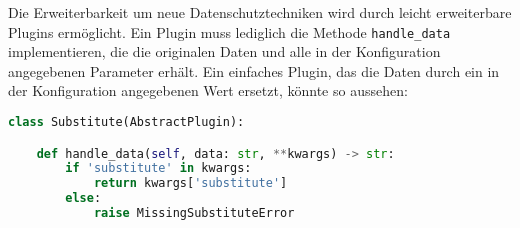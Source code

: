 Die Erweiterbarkeit um neue Datenschutztechniken wird durch leicht erweiterbare Plugins ermöglicht. Ein Plugin muss lediglich die Methode \texttt{handle\_data} implementieren, die die originalen Daten und alle in der Konfiguration angegebenen Parameter erhält. Ein einfaches Plugin, das die Daten durch ein in der Konfiguration angegebenen Wert ersetzt, könnte so aussehen:

\begin{lstlisting}[language=Python]
class Substitute(AbstractPlugin):

    def handle_data(self, data: str, **kwargs) -> str:
        if 'substitute' in kwargs:
            return kwargs['substitute']
        else:
            raise MissingSubstituteError
\end{lstlisting}